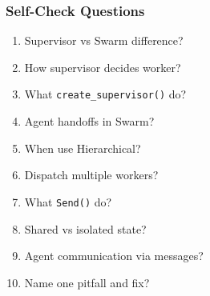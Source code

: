 \documentclass[aspectratio=169,11pt]{beamer}
\begin{document}
\begin{frame}
\frametitle{Self-Check Questions}
\begin{enumerate}
\setlength{\itemsep}{2pt}
\item Supervisor vs Swarm difference?
\item How supervisor decides worker?
\item What \texttt{create\_supervisor()} do?
\item Agent handoffs in Swarm?
\item When use Hierarchical?
\item Dispatch multiple workers?
\item What \texttt{Send()} do?
\item Shared vs isolated state?
\item Agent communication via messages?
\item Name one pitfall and fix?
\end{enumerate}
\end{frame}
\end{document}
